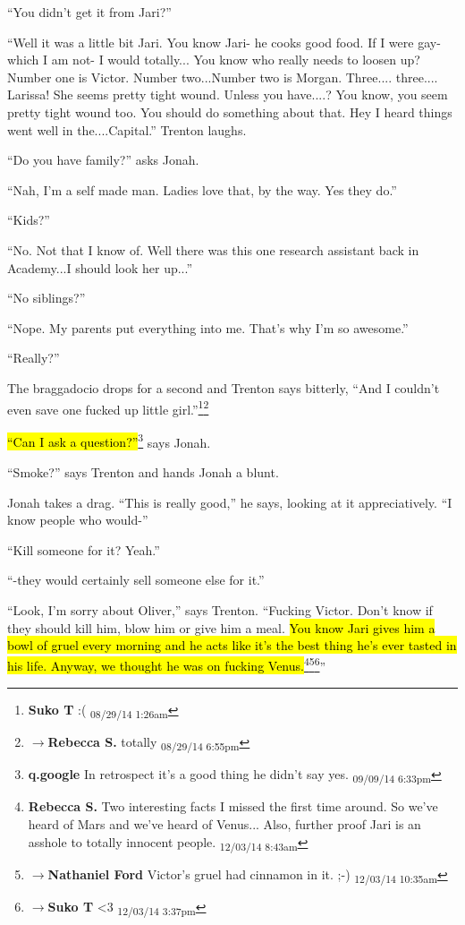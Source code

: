 ``You didn't get it from Jari?''

``Well it was a little bit Jari.  You know Jari- he cooks good food.  If I were gay- which I am not- I would totally... You know who really needs to loosen up?  Number one is Victor.  Number two...Number two is Morgan.  Three.... three.... Larissa!  She seems pretty tight wound.  Unless you have....?  You know, you seem pretty tight wound too.  You should do something about that.  Hey I heard things went well in the....Capital.''  Trenton laughs.

``Do you have family?'' asks Jonah.

``Nah, I'm a self made man.  Ladies love that, by the way.  Yes they do.''

``Kids?''

``No.  Not that I know of.  Well there was this one research assistant back in Academy...I should look her up...''

``No siblings?''  

``Nope.  My parents put everything into me. That's why I'm so awesome.''

``Really?''

The braggadocio drops for a second and Trenton says bitterly, ``And I couldn't even save one fucked up little girl.''\footnote{\textbf{Suko T }:( \textsubscript{08/29/14 1:26am}}\footnote{$\rightarrow$\textbf{Rebecca S. }totally \textsubscript{08/29/14 6:55pm}}

\hl{``Can I ask a question?''}\footnote{\textbf{q.google }In retrospect it's a good thing he didn't say yes. \textsubscript{09/09/14 6:33pm}} says Jonah.

``Smoke?'' says Trenton and hands Jonah a blunt.

Jonah takes a drag.  ``This is really good,'' he says, looking at it appreciatively.  ``I know people who would-''

``Kill someone for it?  Yeah.''

``-they would certainly sell someone else for it.''

``Look, I'm sorry about Oliver,'' says Trenton.  ``Fucking Victor.  Don't know if they should kill him, blow him or give him a meal.   \hl{You know Jari gives him a bowl of gruel every morning and he acts like it's the best thing he's ever tasted in his life.  Anyway, we thought he was on fucking Venus.}\footnote{\textbf{Rebecca S. }Two interesting facts I missed the first time around.  So we've heard of Mars and we've heard of Venus...
Also, further proof Jari is an asshole to totally innocent people. \textsubscript{12/03/14 8:43am}}\footnote{$\rightarrow$\textbf{Nathaniel Ford }Victor's gruel had cinnamon in it. ;-) \textsubscript{12/03/14 10:35am}}\footnote{$\rightarrow$\textbf{Suko T }\textless 3 \textsubscript{12/03/14 3:37pm}}''

